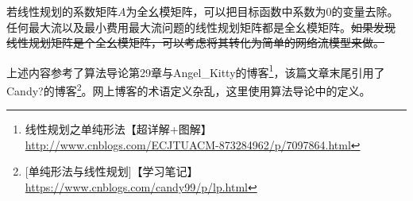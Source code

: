 若线性规划的系数矩阵$A$为全幺模矩阵，可以把目标函数中系数为0的变量去除。
任何最大流以及最小费用最大流问题的线性规划矩阵都是全幺模矩阵。\sout{如果发现
线性规划矩阵是个全幺模矩阵，可以考虑将其转化为简单的网络流模型来做。}

上述内容参考了算法导论\cite{ITA3}第29章与Angel\_Kitty的博客\footnote{
    线性规划之单纯形法【超详解+图解】
    \url{http://www.cnblogs.com/ECJTUACM-873284962/p/7097864.html}
}，该篇文章末尾引用了Candy?的博客\footnote{
    [单纯形法与线性规划]【学习笔记】
    \url{https://www.cnblogs.com/candy99/p/lp.html}
}。网上博客的术语定义杂乱，这里使用算法导论中的定义。
